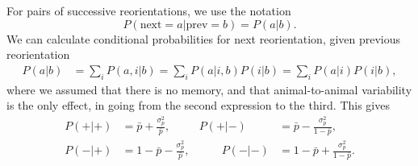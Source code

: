 \documentclass[12pt]{article}
\begin{document}
For pairs of successive reorientations, we use the notation
%
\begin{equation}\label{eq:varipairnot}
  P(\text{next}=a|\text{prev}=b) = P(a|b)
  .
\end{equation}
%
We can calculate conditional probabilities for next reorientation, given previous reorientation
%
\begin{equation}\label{eq:varicondgen}
  \begin{aligned}
    P(a|b) &= \sum_i P(a,i|b)
      = \sum_i P(a|i,b)P(i|b)
      = \sum_i P(a|i)P(i|b),
  \end{aligned}
\end{equation}
%
where we assumed that there is no memory, and that animal-to-animal variability is the only effect, in going from the second expression to the third. This gives
%
\begin{equation}\label{eq:varicond}
  \begin{aligned}
    P(+|+) &= \bar{p} + \frac{\sigma_p^2}{\bar{p}}, &
    P(+|-) &= \bar{p} - \frac{\sigma_p^2}{1-\bar{p}}, \\
    P(-|+) &= 1-\bar{p} - \frac{\sigma_p^2}{\bar{p}}, &\qquad
    P(-|-) &= 1- \bar{p} + \frac{\sigma_p^2}{1-\bar{p}}.
  \end{aligned}
\end{equation}
%
%
\end{document}
